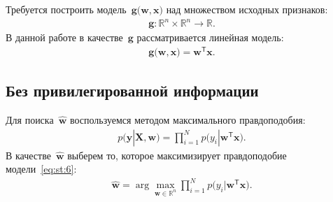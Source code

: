 \documentclass[12pt, twoside]{article}
\numberwithin{equation}{section}
\begin{document}
Требуется построить модель~$\textbf{g}\bigr(\textbf{w}, \textbf{x}\bigr)$ над множеством исходных признаков:
\[
\label{eq:st:5}
\begin{aligned}
\textbf{g}:\mathbb{R}^{n}\times\mathbb{R}^{n} \to \mathbb{R}.
\end{aligned}
\]
В данной работе в качестве~$\textbf{g}$ рассматривается линейная модель:
\[
\label{eq:st:6}
\begin{aligned}
\textbf{g}\bigr(\textbf{w}, \textbf{x}) = \textbf{w}^{\mathsf{T}}\textbf{x}.
\end{aligned}
\]
\subsection{Без привилегированной информации}
Для поиска~$\hat{\textbf{w}}$ воспользуемся методом максимального правдоподобия:
\[
\label{eq:st:6}
\begin{aligned}
p\bigr(\textbf{y}|\textbf{X}, \textbf{w}\bigr) = \prod_{i=1}^{N}p\bigr(y_{i}|\textbf{w}^{\mathsf{T}}\textbf{x}\bigr).
\end{aligned}
\]
В качестве~$\hat{\textbf{w}}$ выберем то, которое максимизирует правдоподобие модели~\eqref{eq:st:6}:
\[
\label{eq:st:7}
\begin{aligned}
\hat{\textbf{w}} = \arg\max_{\textbf{w}\in \mathbb{R}^{n}}\prod_{i=1}^{N}p\bigr(y_{i}|\textbf{w}^{\mathsf{T}}\textbf{x}\bigr).
\end{aligned}
\]
\end{document}
